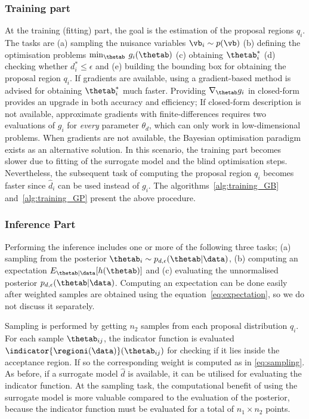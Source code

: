 \subsubsection*{Training part}
\noindent
At the training (fitting) part, the goal is the estimation of the
proposal regions $q_i$. The tasks are (a) sampling the nuisance
variables $\vb_i \sim p(\vb)$ (b) defining the optimisation problems
$\min_{\thetab} \: g_i(\thetab)$ (c) obtaining $\thetab_i^*$ (d)
checking whether $d_i^* \leq \epsilon$ and (e) building the bounding
box for obtaining the proposal region $q_i$. If gradients are
available, using a gradient-based method is advised for obtaining
$\thetab_i^*$ much faster. Providing $\nabla_{\thetab} g_i$ in
closed-form provides an upgrade in both accuracy and efficiency; If
closed-form description is not available, approximate gradients with
finite-differences requires two evaluations of $g_i$ for \emph{every}
parameter $\theta_d$, which can only work in low-dimensional
problems. When gradients are not available, the Bayesian optimisation
paradigm exists as an alternative solution. In this scenario, the
training part becomes slower due to fitting of the surrogate model and
the blind optimisation steps. Nevertheless, the subsequent task of
computing the proposal region $q_i$ becomes faster since $\hat{d}_i$
can be used instead of $g_i$. The algorithms~\ref{alg:training_GB}
and~\ref{alg:training_GP} present the above procedure.

\subsubsection*{Inference Part}
Performing the inference includes one or more of the following three
tasks; (a) sampling from the posterior
$ \thetab_i \sim p_{d, \epsilon}(\thetab|\data)$, (b) computing an
expectation $E_{\thetab|\data}[h(\thetab)]$ and (c) evaluating the
unnormalised posterior $p_{d, \epsilon}(\thetab|\data)$. Computing an
expectation can be done easily after weighted samples are obtained
using the equation~\ref{eq:expectation}, so we do not discuss it
separately.

\noindent
Sampling is performed by getting $n_2$ samples from each proposal
distribution $q_i$. For each sample $\thetab_{ij}$, the indicator
function is evaluated $\indicator{\regioni(\data)}(\thetab_{ij})$ for
checking if it lies inside the acceptance region. If so the
corresponding weight is computed as in \eqref{eq:sampling}. As before,
if a surrogate model $\hat{d}$ is available, it can be utilised for
evaluating the indicator function. At the sampling task, the
computational benefit of using the surrogate model is more valuable
compared to the evaluation of the posterior, because the indicator
function must be evaluated for a total of $n_1 \times n_2$ points.


